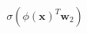 \documentclass[preview]{standalone}
\begin{document}
\begin{align*}
\sigma(\phi(\mathbf{x})^T\mathbf{w}_2)
\end{align*}
\end{document}
